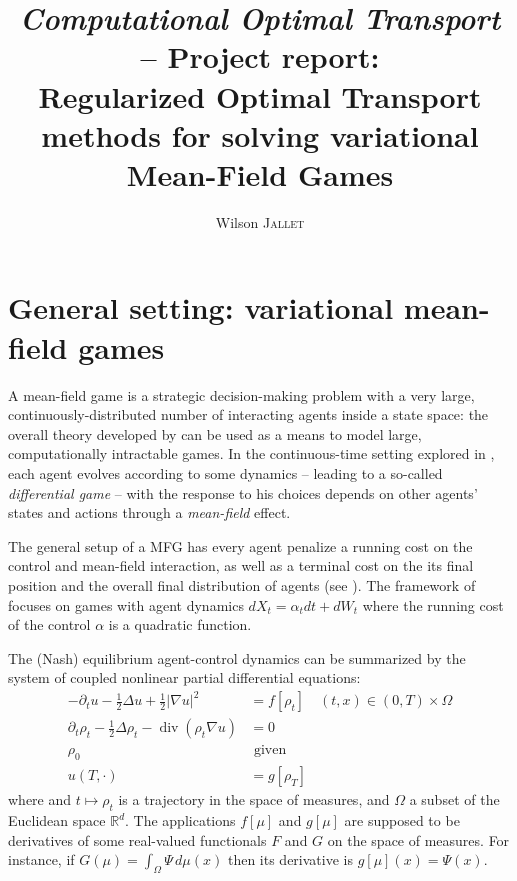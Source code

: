 \documentclass{article}
\author{Wilson \textsc{Jallet}}
\title{
{\large\textit{Computational Optimal Transport} -- \textsf{Project report:}}\\
Regularized Optimal Transport methods for solving variational Mean-Field Games}
\newcommand{\RR}{\mathbb{R}}
\DeclareMathOperator{\divg}{div}
\numberwithin{equation}{section}
\theoremstyle{definition}
\begin{document}
\maketitle


\section{General setting: variational mean-field games}

A mean-field game \cite{LASRY2006619,LASRY2006679} is a strategic decision-making problem with a very large, continuously-distributed number of interacting agents inside a state space: the overall theory developed by \citeauthor{LASRY2006619} can be used as a means to model large, computationally intractable games. In the continuous-time setting explored in \cite{LASRY2006679}, each agent evolves according to some dynamics -- leading to a so-called \textit{differential game} -- with the response to his choices depends on other agents' states and actions through a \textit{mean-field} effect.


The general setup of a MFG has every agent penalize a running cost on the control and mean-field interaction, as well as a terminal cost on the its final position and the overall final distribution of agents (see \cite{LASRY2006679}). The framework of \cites{benamou:hal-01295299}{benamou2018entropy} focuses on games with agent dynamics $dX_t = \alpha_tdt + dW_t$ where the running cost of the control $\alpha$ is a quadratic function.

The (Nash) equilibrium agent-control dynamics can be summarized by the system of coupled nonlinear partial differential equations:
\begin{subequations}\label{eq:VariationalQuadraticMFG}
\begin{align}\label{eq:VarQuadMFGHJB}
	-\partial_t u - \frac{1}{2}\Delta u + \frac12|\nabla u|^2 &= f[\rho_t] \quad (t,x) \in  (0, T) \times \Omega \\\label{eq:VarQuadMFGKolmo}
	\partial_t \rho_t - \frac{1}{2}\Delta\rho_t - \divg(\rho_t \nabla u) &= 0 \\
	\rho_0 &\text{ given} \\
	u(T, \cdot) &= g[\rho_T]
\end{align}
\end{subequations}
where and $t\mapsto \rho_t$ is a trajectory in the space of measures, and $\Omega$ a subset of the Euclidean space $\RR^d$. The applications $f[\mu]$ and $g[\mu]$ are supposed to be derivatives of some real-valued functionals $F$ and $G$ on the space of measures. For instance, if $G(\mu) = \int_\Omega \Psi\,d\mu(x)$ then its derivative is $g[\mu](x) = \Psi(x)$.
\end{document}
